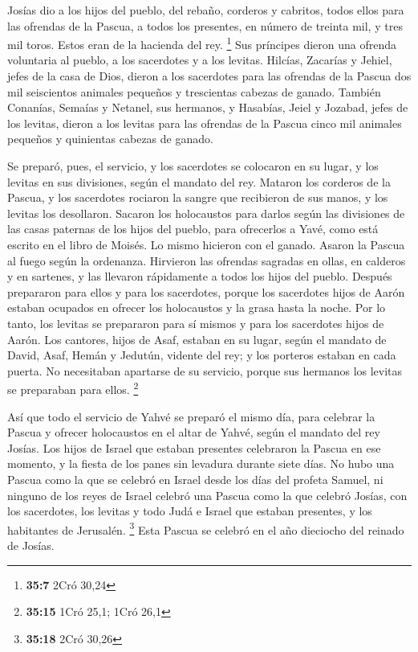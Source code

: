 \begin{paracol}{2}
 Josías dio a los hijos del pueblo, del rebaño, corderos y
cabritos, todos ellos para las ofrendas de la Pascua, a todos los
presentes, en número de treinta mil, y tres mil toros. Estos eran de la
hacienda del rey. \footnote{\textbf{35:7} 2Cró 30,24}  Sus
príncipes dieron una ofrenda voluntaria al pueblo, a los sacerdotes y a
los levitas. Hilcías, Zacarías y Jehiel, jefes de la casa de Dios,
dieron a los sacerdotes para las ofrendas de la Pascua dos mil
seiscientos animales pequeños y trescientas cabezas de ganado.
 También Conanías, Semaías y Netanel, sus hermanos, y
Hasabías, Jeiel y Jozabad, jefes de los levitas, dieron a los levitas
para las ofrendas de la Pascua cinco mil animales pequeños y quinientas
cabezas de ganado.

 Se preparó, pues, el servicio, y los sacerdotes se
colocaron en su lugar, y los levitas en sus divisiones, según el mandato
del rey.  Mataron los corderos de la Pascua, y los
sacerdotes rociaron la sangre que recibieron de sus manos, y los levitas
los desollaron.  Sacaron los holocaustos para darlos
según las divisiones de las casas paternas de los hijos del pueblo, para
ofrecerlos a Yavé, como está escrito en el libro de Moisés. Lo mismo
hicieron con el ganado.  Asaron la Pascua al fuego según
la ordenanza. Hirvieron las ofrendas sagradas en ollas, en calderos y en
sartenes, y las llevaron rápidamente a todos los hijos del pueblo.
 Después prepararon para ellos y para los sacerdotes,
porque los sacerdotes hijos de Aarón estaban ocupados en ofrecer los
holocaustos y la grasa hasta la noche. Por lo tanto, los levitas se
prepararon para sí mismos y para los sacerdotes hijos de Aarón.
 Los cantores, hijos de Asaf, estaban en su lugar, según
el mandato de David, Asaf, Hemán y Jedutún, vidente del rey; y los
porteros estaban en cada puerta. No necesitaban apartarse de su
servicio, porque sus hermanos los levitas se preparaban para ellos.
\footnote{\textbf{35:15} 1Cró 25,1; 1Cró 26,1}

 Así que todo el servicio de Yahvé se preparó el mismo
día, para celebrar la Pascua y ofrecer holocaustos en el altar de Yahvé,
según el mandato del rey Josías.  Los hijos de Israel que
estaban presentes celebraron la Pascua en ese momento, y la fiesta de
los panes sin levadura durante siete días.  No hubo una
Pascua como la que se celebró en Israel desde los días del profeta
Samuel, ni ninguno de los reyes de Israel celebró una Pascua como la que
celebró Josías, con los sacerdotes, los levitas y todo Judá e Israel que
estaban presentes, y los habitantes de Jerusalén. \footnote{\textbf{35:18}
  2Cró 30,26}  Esta Pascua se celebró en el año dieciocho
del reinado de Josías.


\end{paracol}
